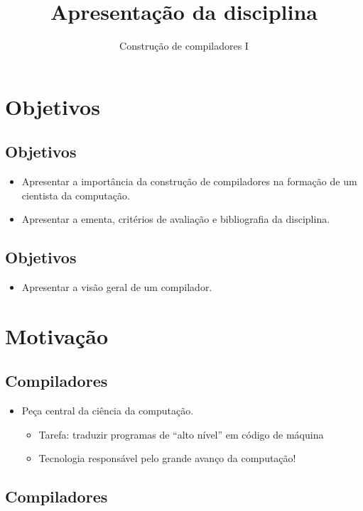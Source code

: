 \documentclass[11pt]{article}
\author{Construção de compiladores I}
\date{}
\title{Apresentação da disciplina}
\begin{document}
\maketitle
\section*{Objetivos}
\label{sec:orge7d13e4}

\subsection*{Objetivos}
\label{sec:orgffc5eee}

\begin{itemize}
\item Apresentar a importância da construção de compiladores na formação de um cientista da computação.
\item Apresentar a ementa, critérios de avaliação e bibliografia da disciplina.
\end{itemize}
\subsection*{Objetivos}
\label{sec:orgd231040}

\begin{itemize}
\item Apresentar a visão geral de um compilador.
\end{itemize}
\section*{Motivação}
\label{sec:orgc37fe1e}

\subsection*{Compiladores}
\label{sec:org2c51b98}

\begin{itemize}
\item Peça central da ciência da computação.
\begin{itemize}
\item Tarefa: traduzir programas de ``alto nível'' em código de máquina
\item Tecnologia responsável pelo grande avanço da computação!
\end{itemize}
\end{itemize}
\subsection*{Compiladores}
\label{sec:orgff16b52}
\end{document}
